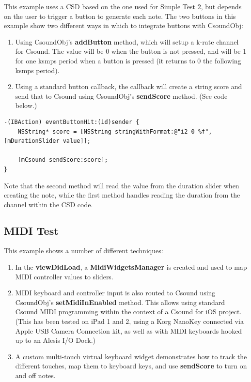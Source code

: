 \documentclass[11pt]{article}
\begin{document}
This example uses a CSD based on the one used for Simple Test 2, but depends on the user to trigger a button to generate each note.  The two buttons in this example show two different ways in which to integrate buttons with CsoundObj:

\begin{enumerate}
\item Using CsoundObj's \textbf{addButton} method, which will setup a k-rate channel for Csound.  The value will be 0 when the button is not pressed, and will be 1 for one ksmps period when a button is pressed (it returns to 0 the following ksmps period).
\item Using a standard button callback, the callback will create a string score and send that to Csound using CsoundObj's \textbf{sendScore} method. (See code below.)
\end{enumerate}


\begin{lstlisting}[caption=Example code showing sending score text to CsoundObj]
-(IBAction) eventButtonHit:(id)sender {
    NSString* score = [NSString stringWithFormat:@"i2 0 %f", [mDurationSlider value]];

    [mCsound sendScore:score];
}
\end{lstlisting}

Note that the second method will read the value from the duration slider when creating the note, while the first method handles reading the duration from the channel within the CSD code.

\subsection{MIDI Test}

This example shows a number of different techniques:

\begin{enumerate}
\item In the \textbf{viewDidLoad}, a \textbf{MidiWidgetsManager} is created and used to map MIDI controller values to sliders.
\item MIDI keyboard and controller input is also routed to Csound using CsoundObj's \textbf{setMidiInEnabled} method. This allows using standard Csound MIDI programming within the context of a Csound for iOS project. (This has been tested on iPad 1 and 2, using a Korg NanoKey connected via Apple USB Camera Connection kit, as well as with MIDI keyboards hooked up to an Alesis I/O Dock.)
\item A custom multi-touch virtual keyboard widget demonstrates how to track the different touches, map them to keyboard keys, and use \textbf{sendScore} to turn on and off notes.
\end{enumerate}
\end{document}
